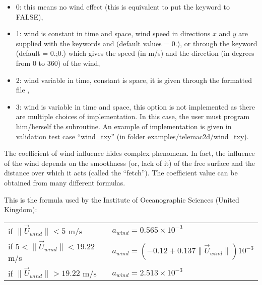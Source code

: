 \begin{itemize}
\item 0: this means no wind effect (this is equivalent to put the
 keyword  to FALSE),

\item 1: wind is constant in time and space, wind speed in directions
$x$ and $y$ are supplied with the keywords  and
 (default values = 0.),
or through the keyword  (default = 0.;0.)
which gives the speed (in m/s) and the direction (in degrees from 0 to 360) of
the wind,

\item 2: wind variable in time, constant is space,
it is given through the formatted file ,

\item 3: wind is variable in time and space, this option is not
implemented as there are multiple choices of implementation.
In this case, the user must program him/herself the  subroutine.
An example of implementation is given in validation test case ``wind\_txy''
(in folder examples/telemac2d/wind\_txy).
\end{itemize}

The coefficient of wind influence hides complex phenomena.
In fact, the influence of the wind depends on the smoothness (or, lack of it)
of the free surface and the distance over which it acts (called the ``fetch'').
The coefficient value can be obtained from many different formulas.

This is the formula used by the Institute of Oceanographic Sciences
(United Kingdom):

\begin{table}[h!]
\begin{center}
\begin{tabular}{ll}

if $\| \vec{U}_{wind} \| < 5$ m/s & $a_{wind}  = 0.565 \times 10^{-3}$ \\
if $5 < \| \vec{U}_{wind} \| < 19.22$ m/s &
 $a_{wind} = (- 0.12 + 0.137 \| \vec{U}_{wind} \| ) 10^{-3}$ \\
if $\| \vec{U}_{wind} \| > 19.22$ m/s & $a_{wind} = 2.513 \times 10^{-3}$ \\
\end{tabular}
\end{center}
\end{table}

